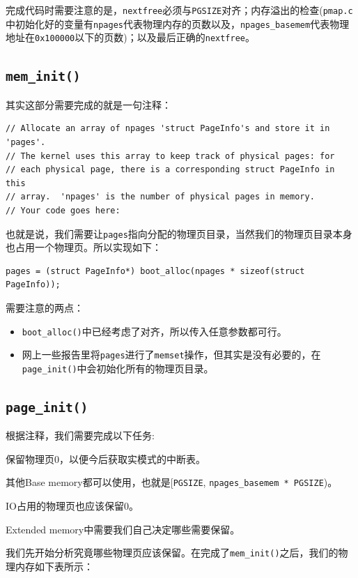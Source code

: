 \documentclass[11pt]{article}
\newenvironment{packed_enum}{
\begin{enumerate}
  \setlength{\itemsep}{1pt}
  \setlength{\parskip}{0pt}
  \setlength{\parsep}{0pt}
}{\end{enumerate}}
\begin{document}
完成代码时需要注意的是，\lstinline|nextfree|必须与\lstinline|PGSIZE|对齐；内存溢出的检查(\lstinline|pmap.c|中初始化好的变量有\lstinline|npages|代表物理内存的页数以及，\lstinline|npages_basemem|代表物理地址在\lstinline|0x100000|以下的页数)；以及最后正确的\lstinline|nextfree|。

\subsection{\lstinline|mem_init()|}
其实这部分需要完成的就是一句注释：
\begin{lstlisting}[title=kern/pmap.c]
// Allocate an array of npages 'struct PageInfo's and store it in 'pages'.
// The kernel uses this array to keep track of physical pages: for
// each physical page, there is a corresponding struct PageInfo in this
// array.  'npages' is the number of physical pages in memory.
// Your code goes here:
\end{lstlisting}
也就是说，我们需要让\lstinline|pages|指向分配的物理页目录，当然我们的物理页目录本身也占用一个物理页。所以实现如下：
\begin{lstlisting}[title=kern/pmap.c]
pages = (struct PageInfo*) boot_alloc(npages * sizeof(struct PageInfo));
\end{lstlisting}
需要注意的两点：
\begin{itemize}
\item \lstinline|boot_alloc()|中已经考虑了对齐，所以传入任意参数都可行。
\item 网上一些报告里将\lstinline|pages|进行了\lstinline|memset|操作，但其实是没有必要的，在\lstinline|page_init()|中会初始化所有的物理页目录。
\end{itemize}

\subsection{\lstinline|page_init()|}
根据注释，我们需要完成以下任务:
\begin{packed_enum}
\item 保留物理页0，以便今后获取实模式的中断表。
\item 其他Base memory都可以使用，也就是[\lstinline|PGSIZE|, \lstinline|npages_basemem * PGSIZE|)。
\item IO占用的物理页也应该保留0。
\item Extended memory中需要我们自己决定哪些需要保留。
\end{packed_enum}

我们先开始分析究竟哪些物理页应该保留。在完成了\lstinline|mem_init()|之后，我们的物理内存如下表所示：
\end{document}
